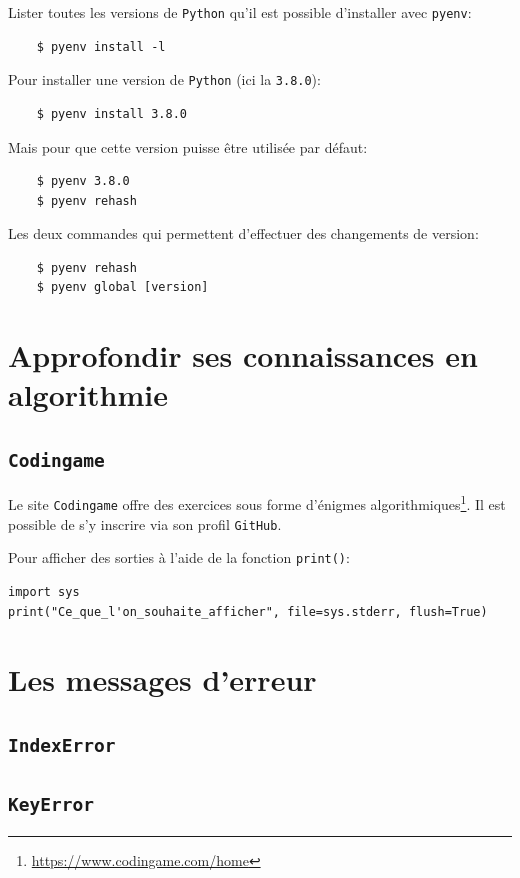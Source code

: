 \documentclass[a4paper,11pt]{book}
\begin{document}
Lister toutes les versions de \texttt{Python} qu'il est possible d'installer avec \texttt{pyenv}:
\begin{verbatim}
    $ pyenv install -l
\end{verbatim}
\medskip

Pour installer une version de \texttt{Python} (ici la \texttt{3.8.0}):
\begin{verbatim}
    $ pyenv install 3.8.0
\end{verbatim}
\medskip

Mais pour que cette version puisse être utilisée par défaut:
\begin{verbatim}
    $ pyenv 3.8.0
    $ pyenv rehash
\end{verbatim}
\medskip

Les deux commandes qui permettent d'effectuer des changements de version:
\begin{verbatim}
    $ pyenv rehash
    $ pyenv global [version]
\end{verbatim}
\medskip

\chapter{Approfondir ses connaissances en algorithmie}
\section{\texttt{Codingame}}
Le site \texttt{Codingame} offre des exercices sous forme d'énigmes algorithmiques\footnote{\url{https://www.codingame.com/home}}. Il est possible de s'y inscrire via son profil \texttt{GitHub}.
\medskip

Pour afficher des sorties à l'aide de la fonction \texttt{print()}:
\begin{lstlisting}
import sys
print("Ce_que_l'on_souhaite_afficher", file=sys.stderr, flush=True)
\end{lstlisting}
\medskip

\chapter{Les messages d'erreur}


\section{\texttt{IndexError}}
\section{\texttt{KeyError}}
\end{document}
